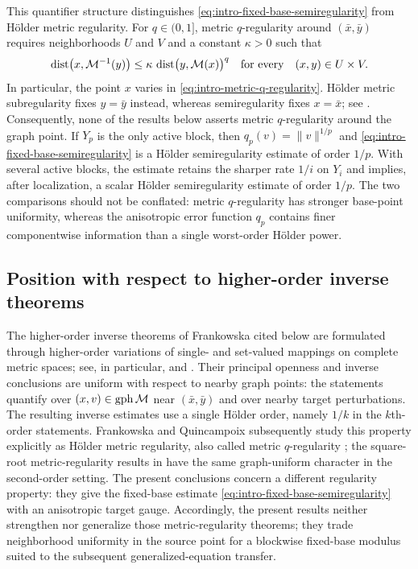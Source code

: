 \documentclass[11pt]{amsart}
\theoremstyle{definition}
\theoremstyle{remark}
\newcommand{\bx}{\bar x}
\newcommand{\by}{\bar y}
\newcommand{\gph}{\mathop{\rm gph}\nolimits}
\newcommand{\dist}{\mathop{\rm dist}\nolimits}
\begin{document}
	This quantifier structure distinguishes \eqref{eq:intro-fixed-base-semiregularity}
	from H\"older metric regularity. For $q\in(0,1]$, metric $q$-regularity
	around $(\bx,\by)$ requires neighborhoods $U$ and $V$ and a constant
	$\kappa>0$ such that
	\begin{equation}
		\dist\bigl(x,\mathcal M^{-1}(y)\bigr)
		\le
		\kappa\,\dist\bigl(y,\mathcal M(x)\bigr)^q
		\quad\text{for every}\quad (x,y)\in U\times V.
		\label{eq:intro-metric-q-regularity}
	\end{equation}
	In particular, the point $x$ varies in
	\eqref{eq:intro-metric-q-regularity}. H\"older metric subregularity fixes
	$y=\by$ instead, whereas semiregularity fixes $x=\bx$; see
	\cite{CibulkaFabianKruger,FrankowskaQuincampoix,
		KrugerHolderSubregularity}. Consequently, none of the results below asserts
	metric $q$-regularity around the graph point. If $Y_p$ is the only active
	block, then $q_p(v)=\|v\|^{1/p}$ and
	\eqref{eq:intro-fixed-base-semiregularity} is a H\"older semiregularity
	estimate of order $1/p$. With several active blocks, the estimate retains
	the sharper rate $1/i$ on $Y_i$ and implies, after localization, a scalar
	H\"older semiregularity estimate of order $1/p$. The two comparisons should
	not be conflated: metric $q$-regularity has stronger base-point uniformity,
	whereas the anisotropic error function $q_p$ contains finer componentwise information than a
	single worst-order H\"older power.
	
	\subsection*{Position with respect to higher-order inverse theorems}
	
	The higher-order inverse theorems of Frankowska cited below are formulated through
	higher-order variations of single- and set-valued mappings on complete
	metric spaces; see, in particular,
	\cite[Theorems~4.1 and~5.7]{FrankowskaHighOrder} and
	\cite[Theorem~2.1 and Section~7]{FrankowskaSomeInverse}. Their
	principal openness and inverse conclusions are uniform with respect to
	nearby graph points: the statements quantify over
	$(x,v)\in\gph\mathcal M$ near $(\bx,\by)$ and over nearby target
	perturbations. The resulting inverse estimates use a single H\"older order,
	namely $1/k$ in the $k$th-order statements. Frankowska and Quincampoix
	subsequently study this
	property explicitly as H\"older metric regularity, also called metric
	$q$-regularity \cite{FrankowskaQuincampoix}; the square-root
	metric-regularity results in
	\cite{ArutyunovKaramzinSquareRoot} have the same graph-uniform character
	in the second-order setting. The present conclusions concern a different
	regularity property: they give the fixed-base estimate
	\eqref{eq:intro-fixed-base-semiregularity} with an anisotropic target gauge.
	Accordingly, the present results neither strengthen nor generalize those
	metric-regularity theorems; they trade neighborhood uniformity in the
	source point for a blockwise fixed-base modulus suited to the subsequent
	generalized-equation transfer.
	
\end{document}

